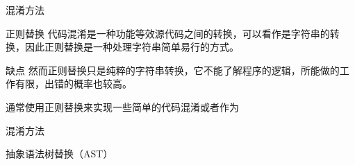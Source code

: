 \documentclass[presentation]{beamer}
\begin{document}
\begin{frame}[label=sec-8]{混淆方法}
\begin{block}{正则替换}
代码混淆是一种功能等效源代码之间的转换，可以看作是字符串的转换，因此正则替换是一种处理字符串简单易行的方式。
\end{block}
\begin{block}{缺点}
然而正则替换只是纯粹的字符串转换，它不能了解程序的逻辑，所能做的工作有限，出错的概率也较高。

通常使用正则替换来实现一些简单的代码混淆或者作为
\end{block}
\end{frame}
\begin{frame}[label=sec-9]{混淆方法}
\begin{block}{抽象语法树替换（AST）}
\end{block}
\end{frame}
\end{document}

